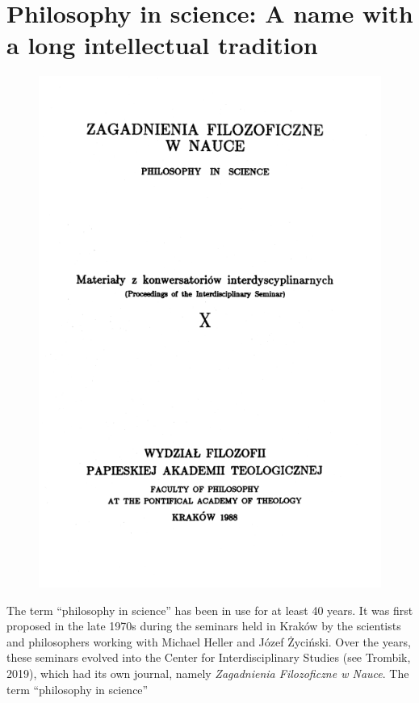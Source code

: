 \documentclass[a4paper]{article}
\title{}
\begin{document}
\section{Philosophy in science: A name with a long intellectual tradition}


\begin{figure}[htp]
\centering
\includegraphics{Polakorg-img001.png}
\end{figure}
The term “philosophy in science” has been in use for at least 40 years. It was first proposed in the late 1970s during
the seminars held in Kraków by the scientists and philosophers working with Michael Heller and Józef Życiński. Over the
years, these seminars evolved into the Center for Interdisciplinary Studies \label{ref:RNDVHajAQnl1F}(see Trombik,
2019), which had its own journal, namely \textit{Zagadnienia Filozoficzne w Nauce}. The term “philosophy in science”
\end{document}
